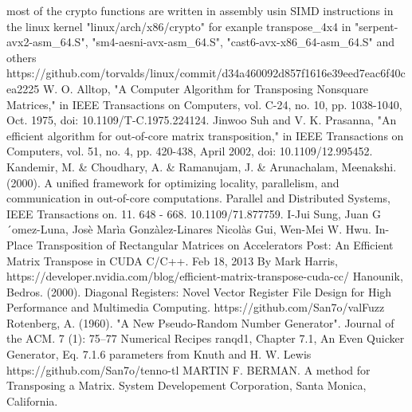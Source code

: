 \documentclass[conference]{IEEEtran}
\begin{document}
\begin{thebibliography}{00}
 most of the crypto functions are written in assembly usin SIMD instructions in the
linux kernel "linux/arch/x86/crypto" for exanple transpose\_4x4 in "serpent-avx2-asm\_64.S", "sm4-aesni-avx-asm\_64.S",
"cast6-avx-x86\_64-asm\_64.S" and others
 https://github.com/torvalds/linux/commit/d34a460092d857f1616e39eed7eac6f40cea2225
 W. O. Alltop, "A Computer Algorithm for Transposing Nonsquare Matrices," in IEEE Transactions on Computers, vol. C-24, no. 10, pp. 1038-1040, Oct. 1975, doi: 10.1109/T-C.1975.224124.
 Jinwoo Suh and V. K. Prasanna, "An efficient algorithm for out-of-core matrix transposition," in IEEE Transactions on Computers, vol. 51, no. 4, pp. 420-438, April 2002, doi: 10.1109/12.995452.
 Kandemir, M. \& Choudhary, A. \& Ramanujam, J. \& Arunachalam, Meenakshi. (2000). A unified framework for optimizing locality, parallelism, and communication in out-of-core computations. Parallel and Distributed Systems, IEEE Transactions on. 11. 648 - 668. 10.1109/71.877759. 
 I-Jui Sung, Juan G´omez-Luna, Josè Marìa Gonzàlez-Linares
Nicolàs Gui, Wen-Mei W. Hwu. In-Place Transposition of Rectangular Matrices on Accelerators
 Post: An Efficient Matrix Transpose in CUDA C/C++. Feb 18, 2013 By Mark Harris, https://developer.nvidia.com/blog/efficient-matrix-transpose-cuda-cc/
 Hanounik, Bedros. (2000). Diagonal Registers: Novel Vector Register File Design for High Performance and Multimedia Computing. 
 https://github.com/San7o/valFuzz
 Rotenberg, A. (1960). "A New Pseudo-Random Number Generator". Journal of the ACM. 7 (1): 75–77
 Numerical Recipes ranqd1, Chapter 7.1, An Even Quicker Generator, Eq. 7.1.6
parameters from Knuth and H. W. Lewis
 https://github.com/San7o/tenno-tl
 MARTIN F. BERMAN.  A method for Transposing a Matrix. System Developement Corporation, Santa Monica, California.
\end{thebibliography}
\vspace{12pt}
\end{document}
